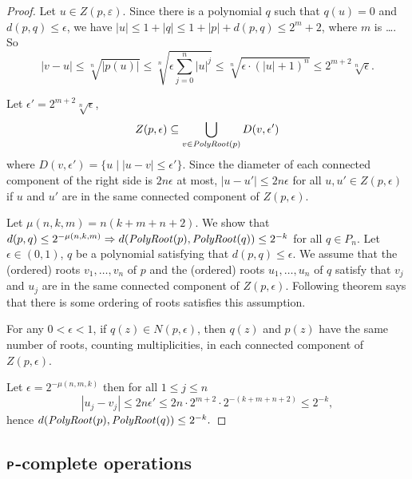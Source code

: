 \documentclass[envcountsame,orivec,oribibl]{llncs}
\begin{document}
\begin{proof}
Let $u \in Z (p, \varepsilon)$. 
Since there is a polynomial $q$ such that $q(u)=0$ and $d(p, q) \le \epsilon$,
we have $|u| \le 1+|q| \le 1 + |p| + d(p, q) \le 2^m + 2$, 
where $m$ is \ldots. %
So
\begin{equation}
 |v - u|
 \le
 \sqrt[n]{|p(u)|}
 \le
 \sqrt[n]{\epsilon \sum_{j=0}^n |u|^j}
 \le
 \sqrt[n]{\epsilon \cdot (|u|+1)^n}
 \le
 2^{m+2} \sqrt[n]{\epsilon}.
\end{equation}


Let $\epsilon' = 2^{m+2} \sqrt[n]{\epsilon}$,
\begin{equation}
 Z(p, \epsilon) \subseteq \bigcup_{v \in \mathit{PolyRoot}(p)} D(v, \epsilon')
\end{equation}
where $D(v, \epsilon') = \{u \mid |u - v| \le \epsilon'\}$.
Since the diameter of each connected component of the right side 
is $2n\epsilon$ at most, $|u - u'| \le 2n\epsilon$ for all 
$u, u' \in Z(p, \epsilon)$ if $u$ and $u'$ are in the same connected component
of $Z(p, \epsilon)$.

Let $\mu(n, k, m) = n(k+m+n+2)$.
We show that 
$
d(p, q) \le 2^{-\mu(n, k, m)} \Rightarrow d(\mathit{PolyRoot}(p), \mathit{PolyRoot}(q)) \le 2^{-k}
$
for all $q \in P_n$.
Let $\epsilon \in (0,1)$, $q$ be a polynomial satisfying that
 $d(p, q) \le \epsilon$.
We assume that the (ordered) roots $v_1, \dots, v_n$ of $p$
and the (ordered) roots $u_1, \dots, u_n$ of $q$ satisfy that
$v_j$ and $u_j$ are in the same connected component of $Z(p, \epsilon)$.
Following theorem says that there is some ordering of roots satisfies this assumption.
\begin{theorem}
\label{theorem: root neighborhoods 2}
 For any $0 < \epsilon < 1$, if $q(z) \in N(p, \epsilon)$,
 then $q(z)$ and $p(z)$ have the same number of roots,
 counting multiplicities, in each connected component of $Z(p, \epsilon)$.
\end{theorem}
Let $\epsilon = 2^{-\mu(n,m,k)}$ then for all $1 \le j \le n$
\begin{equation}
 |u_j - v_j| 
 \le
 2n\epsilon'
 \le
 2n \cdot 2^{m+2} \cdot 2^{-(k+m+n+2)} 
 \le
 2^{-k},
\end{equation}
hence
$
 d(\mathit{PolyRoot}(p), \mathit{PolyRoot}(q)) \le 2^{-k}.
$
\end{proof}

\subsection{$\text{\bfseries \sffamily \upshape P}$-complete operations}
\label{section:P-complete}
\end{document}
